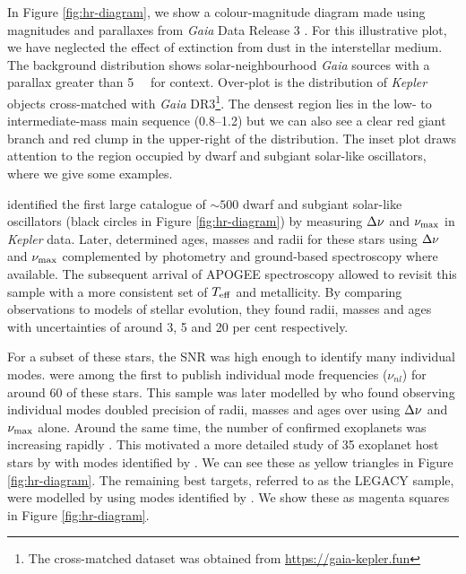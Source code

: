 In Figure \ref{fig:hr-diagram}, we show a colour-magnitude diagram made using magnitudes and parallaxes from \emph{Gaia} Data Release 3 \citep[DR3;][]{GaiaCollaboration.Vallenari.ea2022}. For this illustrative plot, we have neglected the effect of extinction from dust in the interstellar medium. The background distribution shows solar-neighbourhood \emph{Gaia} sources with a parallax greater than \SI{5}{\milli\aarcsec} for context. Over-plot is the distribution of \emph{Kepler} objects cross-matched with \emph{Gaia} DR3\footnote{The cross-matched dataset was obtained from \url{https://gaia-kepler.fun}}. The densest region lies in the low- to intermediate-mass main sequence (\SIrange{0.8}{1.2}{\solarmass}) but we can also see a clear red giant branch and red clump in the upper-right of the distribution. The inset plot draws attention to the region occupied by dwarf and subgiant solar-like oscillators, where we give some examples.

\citet{Chaplin.Kjeldsen.ea2011} identified the first large catalogue of \(\sim 500\) dwarf and subgiant solar-like oscillators (black circles in Figure \ref{fig:hr-diagram}) by measuring \({\Delta\nu}\) and \({\nu_\mathrm{max}}\) in \emph{Kepler} data. Later, \citet{Chaplin.Basu.ea2014} determined ages, masses and radii for these stars using \({\Delta\nu}\) and \({\nu_\mathrm{max}}\) complemented by photometry and ground-based spectroscopy where available. The subsequent arrival of APOGEE spectroscopy allowed \citet{Serenelli.Johnson.ea2017} to revisit this sample with a more consistent set of \({T_\mathrm{eff}}\) and metallicity. By comparing observations to models of stellar evolution, they found radii, masses and ages with uncertainties of around 3, 5 and 20 per cent respectively.

For a subset of these stars, the SNR was high enough to identify many individual modes. \citet{Appourchaux.Chaplin.ea2012} were among the first to publish individual mode frequencies (\(\nu_{nl}\)) for around 60 of these stars. This sample was later modelled by \citet{Metcalfe.Creevey.ea2014} who found observing individual modes doubled precision of radii, masses and ages over using \({\Delta\nu}\) and \({\nu_\mathrm{max}}\) alone. Around the same time, the number of confirmed exoplanets was increasing rapidly \citep{Burke.Bryson.ea2014}. This motivated a more detailed study of 35 exoplanet host stars by \citet{SilvaAguirre.Davies.ea2015} with modes identified by \citet{Davies.SilvaAguirre.ea2016}. We can see these as yellow triangles in Figure \ref{fig:hr-diagram}. The remaining best targets, referred to as the LEGACY sample, were modelled by \citet{SilvaAguirre.Lund.ea2017} using modes identified by \citet{Lund.SilvaAguirre.ea2017}. We show these as magenta squares in Figure \ref{fig:hr-diagram}.

